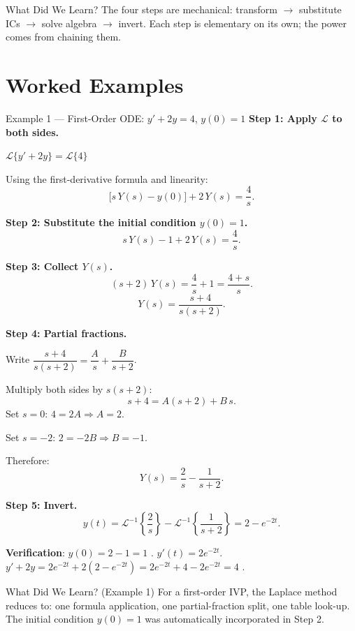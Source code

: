 \documentclass[12pt,a4paper]{article}
\begin{document}
\begin{learnbox}{What Did We Learn?}
The four steps are mechanical: transform $\to$ substitute ICs $\to$
solve algebra $\to$ invert. Each step is elementary on its own; the
power comes from chaining them.
\end{learnbox}

\section{Worked Examples}

\begin{infobox}{Example 1 --- First-Order ODE: $y' + 2y = 4$, $y(0)=1$}
\textbf{Step 1: Apply $\mathcal{L}$ to both sides.}

$\mathcal{L}\{y' + 2y\} = \mathcal{L}\{4\}$

Using the first-derivative formula and linearity:
\[
  \bigl[s\,Y(s) - y(0)\bigr] + 2\,Y(s) = \frac{4}{s}.
\]

\textbf{Step 2: Substitute the initial condition $y(0)=1$.}
\[
  s\,Y(s) - 1 + 2\,Y(s) = \frac{4}{s}.
\]

\textbf{Step 3: Collect $Y(s)$.}
\[
  (s+2)\,Y(s) = \frac{4}{s} + 1 = \frac{4 + s}{s}.
\]
\[
  Y(s) = \frac{s+4}{s(s+2)}.
\]

\textbf{Step 4: Partial fractions.}

Write $\dfrac{s+4}{s(s+2)} = \dfrac{A}{s} + \dfrac{B}{s+2}$.

Multiply both sides by $s(s+2)$:
\[
  s + 4 = A(s+2) + B\,s.
\]
Set $s=0$: $4 = 2A \Rightarrow A = 2$.

Set $s=-2$: $2 = -2B \Rightarrow B = -1$.

Therefore:
\[
  Y(s) = \frac{2}{s} - \frac{1}{s+2}.
\]

\textbf{Step 5: Invert.}
\[
  y(t) = \mathcal{L}^{-1}\!\left\{\frac{2}{s}\right\}
         - \mathcal{L}^{-1}\!\left\{\frac{1}{s+2}\right\}
       = 2 - e^{-2t}.
\]

\textbf{Verification}: $y(0) = 2 - 1 = 1$ \checkmark.
$y'(t) = 2e^{-2t}$.
$y' + 2y = 2e^{-2t} + 2(2-e^{-2t}) = 2e^{-2t} + 4 - 2e^{-2t} = 4$
\checkmark.
\end{infobox}

\begin{learnbox}{What Did We Learn? (Example 1)}
For a first-order IVP, the Laplace method reduces to: one formula
application, one partial-fraction split, one table look-up. The initial
condition $y(0)=1$ was automatically incorporated in Step 2.
\end{learnbox}
\end{document}
